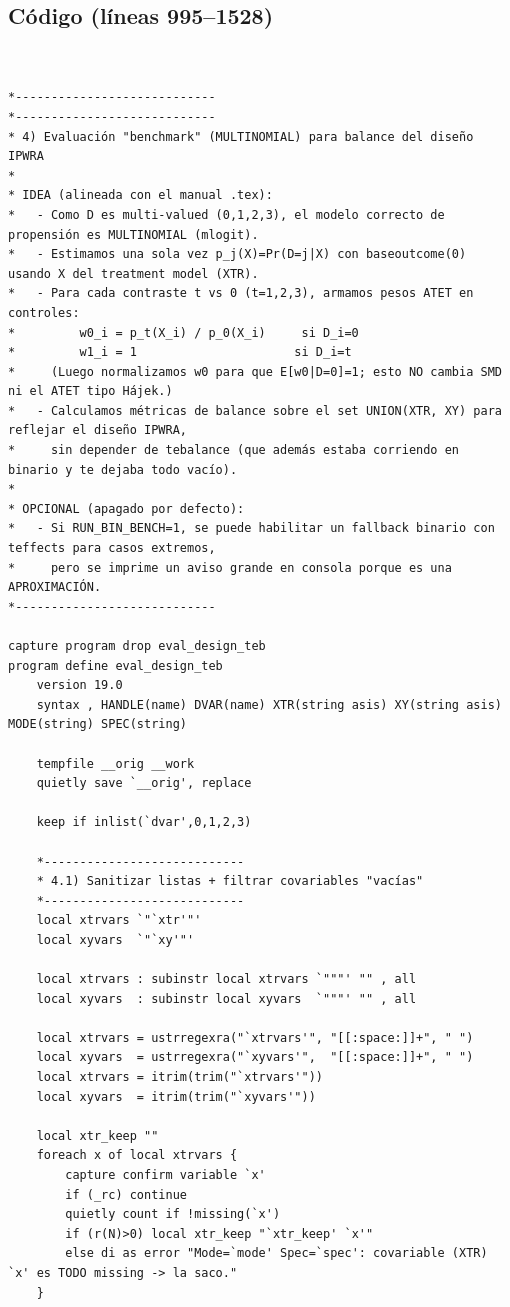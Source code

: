 \documentclass[12pt]{article}
\begin{document}
\subsection*{Código (líneas 995--1528)}
\begin{lstlisting}


*----------------------------
*----------------------------
* 4) Evaluación "benchmark" (MULTINOMIAL) para balance del diseño IPWRA
*
* IDEA (alineada con el manual .tex):
*   - Como D es multi-valued (0,1,2,3), el modelo correcto de propensión es MULTINOMIAL (mlogit).
*   - Estimamos una sola vez p_j(X)=Pr(D=j|X) con baseoutcome(0) usando X del treatment model (XTR).
*   - Para cada contraste t vs 0 (t=1,2,3), armamos pesos ATET en controles:
*         w0_i = p_t(X_i) / p_0(X_i)     si D_i=0
*         w1_i = 1                      si D_i=t
*     (Luego normalizamos w0 para que E[w0|D=0]=1; esto NO cambia SMD ni el ATET tipo Hájek.)
*   - Calculamos métricas de balance sobre el set UNION(XTR, XY) para reflejar el diseño IPWRA,
*     sin depender de tebalance (que además estaba corriendo en binario y te dejaba todo vacío).
*
* OPCIONAL (apagado por defecto):
*   - Si RUN_BIN_BENCH=1, se puede habilitar un fallback binario con teffects para casos extremos,
*     pero se imprime un aviso grande en consola porque es una APROXIMACIÓN.
*----------------------------

capture program drop eval_design_teb
program define eval_design_teb
    version 19.0
    syntax , HANDLE(name) DVAR(name) XTR(string asis) XY(string asis) MODE(string) SPEC(string)

    tempfile __orig __work
    quietly save `__orig', replace

    keep if inlist(`dvar',0,1,2,3)

    *----------------------------
    * 4.1) Sanitizar listas + filtrar covariables "vacías"
    *----------------------------
    local xtrvars `"`xtr'"'
    local xyvars  `"`xy'"'

    local xtrvars : subinstr local xtrvars `"""' "" , all
    local xyvars  : subinstr local xyvars  `"""' "" , all

    local xtrvars = ustrregexra("`xtrvars'", "[[:space:]]+", " ")
    local xyvars  = ustrregexra("`xyvars'",  "[[:space:]]+", " ")
    local xtrvars = itrim(trim("`xtrvars'"))
    local xyvars  = itrim(trim("`xyvars'"))

    local xtr_keep ""
    foreach x of local xtrvars {
        capture confirm variable `x'
        if (_rc) continue
        quietly count if !missing(`x')
        if (r(N)>0) local xtr_keep "`xtr_keep' `x'"
        else di as error "Mode=`mode' Spec=`spec': covariable (XTR) `x' es TODO missing -> la saco."
    }


\end{lstlisting}
\end{document}

